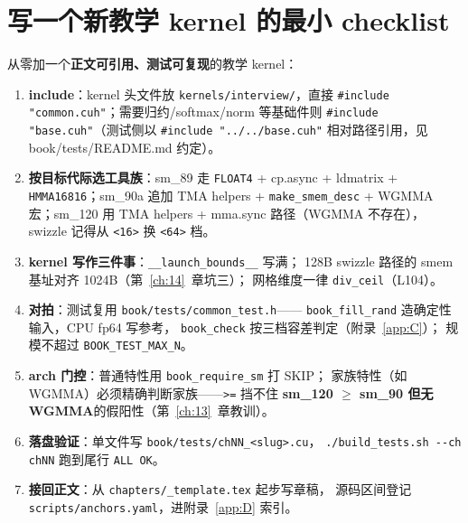 \section{写一个新教学 kernel 的最小 checklist}

从零加一个\textbf{正文可引用、测试可复现}的教学 kernel：

\begin{enumerate}
  \item \textbf{include}：kernel 头文件放 \texttt{kernels/\allowbreak{}interview/\allowbreak{}}，直接
        \texttt{\#include "common.\allowbreak{}cuh"}；需要归约/softmax/norm 等基础件则
        \texttt{\#include "base.cuh"}（测试侧以 \texttt{\#include ".\allowbreak{}.\allowbreak{}/\allowbreak{}.\allowbreak{}.\allowbreak{}/\allowbreak{}base.\allowbreak{}cuh"}
        相对路径引用，见 book/tests/README.md 约定）。
  \item \textbf{按目标代际选工具族}：sm\_89 走 \texttt{FLOAT4} + cp.async +
        ldmatrix + \texttt{HMMA16816}；sm\_90a 追加 TMA helpers +
        \texttt{make\_\allowbreak{}smem\_\allowbreak{}desc} + WGMMA 宏；sm\_120 用 TMA helpers +
        mma.sync 路径（WGMMA 不存在），swizzle 记得从 \texttt{<16>} 换
        \texttt{<64>} 档。
  \item \textbf{kernel 写作三件事}：\texttt{\_\allowbreak{}\_\allowbreak{}launch\_\allowbreak{}bounds\_\allowbreak{}\_\allowbreak{}} 写满；
        128B swizzle 路径的 smem 基址对齐 1024B（第~\ref{ch:14}~章坑三）；
        网格维度一律 \texttt{div\_ceil}（L104）。
  \item \textbf{对拍}：测试复用 \texttt{book/\allowbreak{}tests/\allowbreak{}common\_\allowbreak{}test.\allowbreak{}h}——
        \texttt{book\_\allowbreak{}fill\_\allowbreak{}rand} 造确定性输入，CPU fp64 写参考，
        \texttt{book\_check} 按三档容差判定（附录~\ref{app:C}）；
        规模不超过 \texttt{BOOK\_\allowbreak{}TEST\_\allowbreak{}MAX\_\allowbreak{}N}。
  \item \textbf{arch 门控}：普通特性用 \texttt{book\_\allowbreak{}require\_\allowbreak{}sm} 打 SKIP；
        家族特性（如 WGMMA）必须精确判断家族——\texttt{>=} 挡不住
        \textbf{sm\_120 $\ge$ sm\_90 但无 WGMMA}的假阳性（第~\ref{ch:13}~章教训）。
  \item \textbf{落盘验证}：单文件写 \texttt{book/\allowbreak{}tests/\allowbreak{}ch\allowbreak{}NN\_\allowbreak{}<slug>.\allowbreak{}cu}，
        \texttt{.\allowbreak{}/\allowbreak{}build\_\allowbreak{}tests.\allowbreak{}sh -{}-ch ch\allowbreak{}NN} 跑到尾行 \texttt{ALL OK}。
  \item \textbf{接回正文}：从 \texttt{chapters/\allowbreak{}\_\allowbreak{}template.\allowbreak{}tex} 起步写章稿，
        源码区间登记 \texttt{scripts/\allowbreak{}anchors.\allowbreak{}yaml}，进附录~\ref{app:D} 索引。
\end{enumerate}
